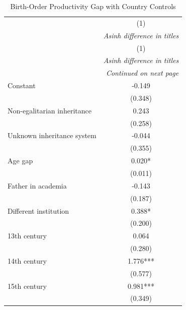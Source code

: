 
\begin{center}

\small

\begin{longtable}{l c}

\caption{Birth-Order Productivity Gap with Country Controls}
\label{tab:country_fe_appendix} \\

\toprule
& (1) \\
& \textit{Asinh difference in titles} \\
\midrule
\endfirsthead

\toprule
& (1) \\
& \textit{Asinh difference in titles} \\
\midrule
\endhead

\midrule
\multicolumn{2}{r}{\textit{Continued on next page}} \\
\midrule
\endfoot

\bottomrule
\endlastfoot

Constant
& -0.149 \\
& (0.348) \\

Non-egalitarian inheritance
& 0.243 \\
& (0.258) \\

Unknown inheritance system
& -0.044 \\
& (0.355) \\

Age gap
& 0.020* \\
& (0.011) \\

Father in academia
& -0.143 \\
& (0.187) \\

Different institution
& 0.388* \\
& (0.200) \\

13th century
& 0.064 \\
& (0.280) \\

14th century
& 1.776*** \\
& (0.577) \\

15th century
& 0.981*** \\
& (0.349) \\


\end{longtable}
\end{center}
